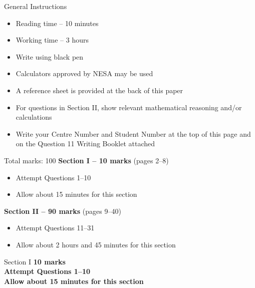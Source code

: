 \documentclass[12pt, a4paper]{article}
\begin{document}
\begin{coverpage}
    \vspace*{28ex}


    \vspace{4ex}
    \vspace{4ex}
    \begin{examinfo}{General Instructions}
        \vspace{-2.75ex} %
        \begin{itemize}
            \item Reading time – 10 minutes
            \item Working time – 3 hours
            \item Write using black pen
            \item Calculators approved by NESA may be used
            \item A reference sheet is provided at the back of this paper
            \item For questions in Section II, show relevant mathematical reasoning and/or calculations
            \item Write your Centre Number and Student Number at the top of this page and on the Question 11 Writing Booklet attached
        \end{itemize}
    \end{examinfo}

    \begin{examinfo}{Total marks: 100}
        \textbf{Section I – 10 marks} (pages 2–8)
        \begin{itemize}
            \item Attempt Questions 1–10
            \item Allow about 15 minutes for this section
        \end{itemize}
        \textbf{Section II – 90 marks} (pages 9–40)
        \begin{itemize}
            \item Attempt Questions 11–31
            \item Allow about 2 hours and 45 minutes for this section
        \end{itemize}
    \end{examinfo}
\end{coverpage}

\begin{sectionheader}{Section I}
    {\bfseries
        10 marks\\
        Attempt Questions 1–10\\
        Allow about 15 minutes for this section}
\end{sectionheader}
\end{document}

